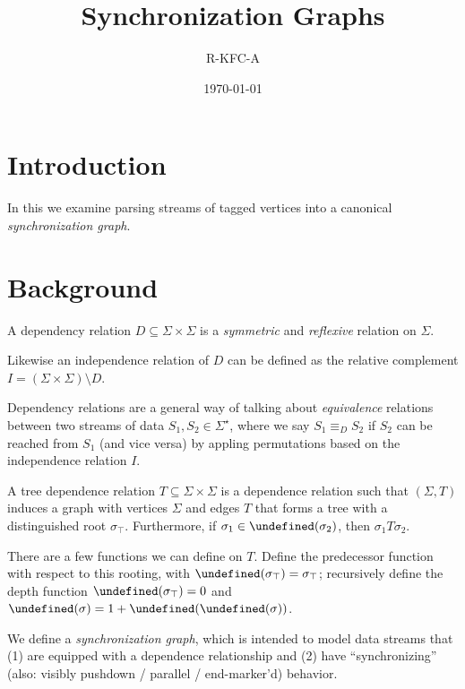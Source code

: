 \documentclass[12pt]{article}
\title{Synchronization Graphs}
\author{R-KFC-A}
\date{\today}
\date{}
\let\pred\undefined
\newcommand{\pred}{\mathbf{pred}}
\let\ancestors\undefined
\newcommand{\ancestors}{\mathbf{ancestors}}
\let\depth\undefined
\newcommand{\depth}{\mathbf{depth}}
\begin{document}
\maketitle

\section{Introduction}

In this we examine parsing streams of tagged vertices
into a canonical \textit{synchronization graph}.


\section{Background}

\begin{definition}
  A dependency relation \(D \subseteq \Sigma \times \Sigma\)
  is a \textit{symmetric} and \textit{reflexive}
  relation on \(\Sigma\).
\end{definition}

Likewise an independence relation of \(D\) can be defined as
the relative complement
\(I = (\Sigma \times \Sigma) \setminus D\).

Dependency relations are a general way of talking about
\textit{equivalence} relations between two streams of data
\(S_1, S_2 \in \Sigma^\star\),
where we say \(S_1 \equiv_D S_2\) if \(S_2\) can be reached from \(S_1\)
(and vice versa) by appling permutations based on
the independence relation \(I\).

\begin{definition}
  A tree dependence relation \(T \subseteq \Sigma \times \Sigma\)
  is a dependence relation such that
  \((\Sigma, T)\) induces a graph with vertices
  \(\Sigma\) and edges \(T\)
  that forms a tree with a distinguished root \(\sigma_{\top}\).
  Furthermore, if \(\sigma_1 \in \ancestors(\sigma_2)\), then
  \(\sigma_1 T \sigma_2\).
\end{definition}

There are a few functions we can define on \(T\).
  Define the predecessor function with respect to this rooting,
  with \(\pred(\sigma_\top) = \sigma_\top\);
  recursively define the depth function
  \(\depth(\sigma_\top) = 0\) and
  \(\depth(\sigma) = 1 + \depth(\pred(\sigma))\).

We define a \textit{synchronization graph},
which is intended to model data streams that
(1) are equipped with a dependence relationship
and (2) have ``synchronizing''
(also: visibly pushdown / parallel / end-marker'd) behavior.
\end{document}
